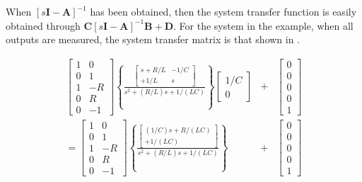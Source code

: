 When $\left[s\mathbf{I}-\mathbf{A}\right]^{-1}$ has been obtained,
then the system transfer function is easily obtained through
$\mathbf{C}\left[s\mathbf{I}-\mathbf{A}\right]^{-1}\mathbf{B}+\mathbf{D}$.
For the system in the example, when all outputs are measured, the
system transfer matrix is that shown in .

\begin{slide}\label{slide:l2eg3}
\begin{eqnarray*}
\left[\begin{array}{cc}
  1 & 0 \\
  0 & 1 \\
  1 & -R \\
  0 & R \\
  0 & -1
\end{array}\right]
\left\{\frac{\left[
\begin{array}{cc}
  s+R/L & -1/C \\
 +1/L & s
\end{array}\right]}{s^2 + (R/L)s +1/(LC)}\right\}
\left[\begin{array}{c}
  1/C \\
  0
\end{array}\right]
 &+& \left[\begin{array}{c}
  0 \\
  0 \\
  0 \\
  0 \\
  1
\end{array} \right]\\
= \left[\begin{array}{cc}
  1 & 0 \\
  0 & 1 \\
  1 & -R \\
  0 & R \\
  0 & -1
\end{array}\right]
\left\{\frac{\left[
\begin{array}{c}
  (1/C)s+R/(LC)  \\
 +1/(LC)
\end{array}\right]}{s^2 + (R/L)s +1/(LC)}\right\}
 &+& \left[\begin{array}{c}
  0 \\
  0 \\
  0 \\
  0 \\
  1
\end{array} \right]\\
\end{eqnarray*}
\end{slide}
